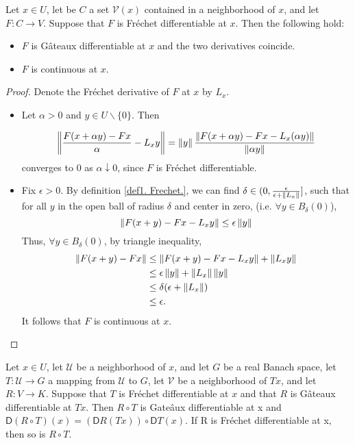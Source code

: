 \begin{lemma}
	Let $x \in U$, let be $C$ a set $\mathcal{V}(x)$ contained in a neighborhood of $x$, and let $F: C \rightarrow V$. Suppose that $F$ is Fr\'echet differentiable at $x$. Then the following hold:
	\begin{itemize}
	\item  $F$ is G\^ateaux differentiable at $x$ and the two derivatives coincide.
	\item $F$ is continuous at $x$.
	\end{itemize}
	\begin{proof}
		Denote the Fr\'echet derivative of $F$ at $x$ by $L_x$.
		\begin{itemize}
			\item Let $\alpha >0$ and $y \in U\backslash\{0\}$. Then
			
			\[
				\left\lVert\frac{F(x+\alpha y)-Fx}{\alpha}-L_xy\right\rVert = \left\lVert y\right\rVert\frac{\left\lVert F(x+\alpha y)-Fx-L_x(\alpha y)\right\rVert}{\left\lVert\alpha y\right\rVert}
			\]
			converges to $0$ as $\alpha \downarrow 0$, since $F$ is Fr\'echet differentiable.
			\item Fix $\epsilon > 0$. By definition \ref{def1. Frechet.}, we can find $\delta \in  (0, \frac{\epsilon}{\epsilon + \left\lVert L_x\right\rVert}]$, such that for all $y$ in the open ball of radius $\delta$ and center in zero, (i.e. $\forall y \in B_\delta(0)$), 
			\[
			   \left\lVert F(x+y)-Fx-L_xy\right\rVert \leq \epsilon \left\lVert y\right\rVert\]
			Thus, $\forall y \in B_\delta(0)$,  by triangle inequality, 
			 \begin{align*}  
			\left\lVert F(x+y)-Fx\right\rVert &\leq \left\lVert F(x+y) -Fx-L_xy\right\rVert + 
			\left\lVert L_xy\right\rVert \\ &\leq \epsilon \left\lVert y\right\rVert + \left\lVert L_x \right\rVert\left\lVert y\right\rVert \\ &\leq \delta(\epsilon + \left\lVert L_x\right\rVert)
			\\
			&\leq \epsilon.
			\end{align*}
			It follows that $F$ is continuous at $x$.
		\end{itemize}
	\end{proof}
\end{lemma}



\begin{fact}
	Let $x\in U$,  let $\mathcal{U}$ be a neighborhood of $x$, and let $G$ be a real Banach space, let $T: \mathcal{U}\rightarrow G$ a mapping from $\mathcal{U}$ to $G$, let $\mathcal{V}$ be a neighborhood of $Tx$, and let $R : V \rightarrow K$.
	Suppose that $T$ is Fr\'echet differentiable at $x$ and that $R$ is G\^ateaux differentiable at $Tx$. Then $R\circ T$ is Gate\^aux differentiable at x and $\mathsf{D}(R \circ T )(x) =
	(\mathsf{D}R(Tx))\circ \mathsf{D}T (x)$. If R is Fr\'echet differentiable at x, then so is $R \circ T $.
\end{fact}

